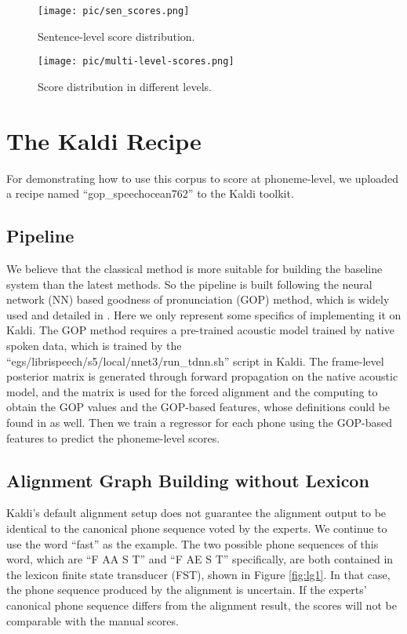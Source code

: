 \documentclass[a4paper]{article}
\begin{document}
\begin{figure}[t]
  \centering
  \texttt{[image: pic/sen\_scores.png]}
  \caption{Sentence-level score distribution.}
  \label{fig:sen_scores}
\end{figure}

\begin{figure}[t]
  \centering
  \texttt{[image: pic/multi-level-scores.png]}
  \caption{Score distribution in different levels.}
  \label{fig:multi_level_scores}
\end{figure}

\section{The Kaldi Recipe}

For demonstrating how to use this corpus to score at phoneme-level, we uploaded a recipe named ``gop\_speechocean762'' to the Kaldi toolkit.

\subsection{Pipeline}
We believe that the classical method is more suitable for building the baseline system than the latest methods.
So the pipeline is built following the neural network (NN) based goodness of pronunciation (GOP) method, which is widely used and detailed in \cite{hu2015improved}.
Here we only represent some specifics of implementing it on Kaldi.
The GOP method requires a pre-trained acoustic model trained by native spoken data, which is trained by the ``egs/librispeech/s5/local/nnet3/run\_tdnn.sh'' script in Kaldi.
The frame-level posterior matrix is generated through forward propagation on the native acoustic model, and the matrix is used for the forced alignment and the computing to obtain the GOP values and the GOP-based features, whose definitions could be found in \cite{hu2015improved} as well.
Then we train a regressor for each phone using the GOP-based features to predict the phoneme-level scores.

\subsection{Alignment Graph Building without Lexicon}

Kaldi's default alignment setup does not guarantee the alignment output to be identical to the canonical phone sequence voted by the experts. We continue to  use the word ``fast'' as the example. The two possible phone sequences of this word, which are ``F AA S T'' and ``F AE S T'' specifically, are both contained in the lexicon finite state transducer (FST), shown in Figure \ref{fig:lg1}. In that case, the phone sequence produced by the alignment is uncertain. If the experts' canonical phone sequence differs from the alignment result, the scores will not be comparable with the manual scores.
\end{document}
